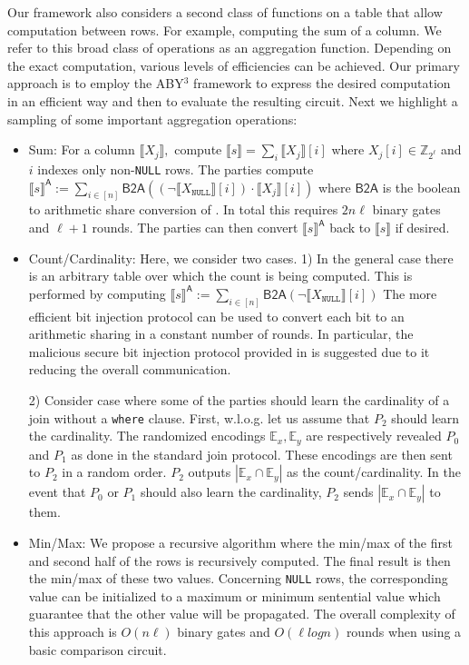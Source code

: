 \documentclass[11pt,letterpaper]{article}
\newcommand{\Party}[1]{\ensuremath{P_{#1}}\xspace}
\newcommand{\share}[1]{\ensuremath{\llbracket #1\rrbracket}\xspace}
\newcommand{\shareA}[1]{\ensuremath{\llbracket #1\rrbracket}^{\textsf{A}}\xspace}
\newcommand{\Null}{\texttt{NULL}\xspace}
\newcommand{\XNull}{\ensuremath{X_\Null}\xspace}
\begin{document}
Our framework also considers a second class of functions on a table that allow computation between rows. For example, computing the sum of a column. We refer to this broad class of operations as an aggregation function. Depending on the exact computation, various levels of efficiencies can be achieved. Our primary approach is to employ the ABY$^3$ framework \cite{aby3} to express the desired computation in an efficient way and then to evaluate the resulting circuit. Next we highlight a sampling of some important aggregation operations:
\begin{itemize}
	\item Sum: For a column $\share{X_j},$ compute $\share{s}=\sum_i \share{X_j}[i]$ where $X_j[i]\in \mathbb{Z}_{2^\ell}$ and $i$ indexes only non-\Null rows. The parties compute $\shareA{s}:=\sum_{i\in [n]}\textsf{B2A}((\neg\share{\XNull}[i]) \cdot \share{X_j}[i])$ where $\textsf{B2A}$ is the boolean to arithmetic share conversion of \cite{aby3}. In total this requires $2n\ell$ binary gates and $\ell+1$ rounds\cite{aby3}. The parties can then convert $\shareA{s}$ back to \share{s} if desired. 
	\item Count/Cardinality: Here, we consider two cases. 1) In the general case there is an arbitrary table over which the count is being computed. This is performed by computing $\shareA{s}:=\sum_{i\in [n]}\textsf{B2A}(\neg\share{\XNull}[i])$ 
	\iffullversion 
	The more efficient bit injection protocol\cite{aby3} can be used to convert each bit to an arithmetic sharing in a constant number of rounds. In particular, the malicious secure bit injection protocol provided in \cite{aby3} is suggested due to it reducing the overall communication. 
	\fi

	2) Consider case where some of the parties should learn the cardinality of a join without a \texttt{where} clause. First, w.l.o.g. let us assume that \Party{2} should learn the cardinality. The randomized encodings $\mathbb{E}_x,\mathbb{E}_y$ are respectively revealed \Party{0} and \Party{1}  as done in the standard join protocol. These encodings are then sent to \Party{2} in a random order. \Party{2} outputs $|\mathbb{E}_x \cap \mathbb{E}_y|$ as the count/cardinality. In the event that \Party{0} or \Party{1} should also learn the cardinality, \Party{2} sends $|\mathbb{E}_x \cap \mathbb{E}_y|$ to them.

	\item  Min/Max: We propose a recursive algorithm where the min/max of the first and second half of the rows is recursively computed. The final result is then the min/max of these two values.  Concerning \texttt{NULL} rows, the corresponding value can be initialized to a maximum or minimum sentential value which guarantee that the other value will be propagated. The overall complexity of this approach is $O(n\ell)$ binary gates and $O(\ell log n)$ rounds when using a basic comparison circuit\cite{aby3}.
\end{itemize}
\end{document}
